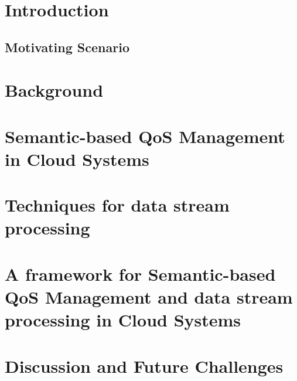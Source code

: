 \documentclass[preprint,12pt]{elsarticle}
\begin{document}
\section{Introduction}

\subsection{Motivating Scenario}\label{motivating}

\section{Background}

\section{Semantic-based QoS Management in Cloud Systems}\label{qos-semantics}

\section{Techniques for data stream processing}\label{data-stream}

\section{A framework for Semantic-based QoS Management and data stream processing in Cloud Systems}\label{framework}

% 
\section{Discussion and Future Challenges}\label{discussion}

\end{document}

